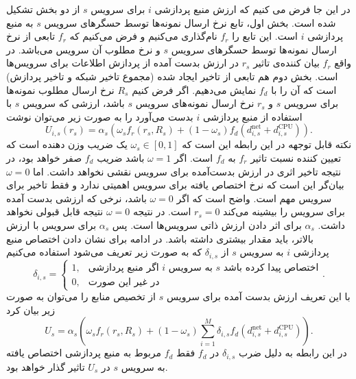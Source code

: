     در این جا فرض می کنیم که ارزش منبع پردازشی $i$ برای سرویس $s$ از دو بخش تشکیل شده است.
    بخش اول، تابع نرخ ارسال نمونه‌ها توسط حسگر‌های سرویس $s$ به منبع پردازشی $i$ است.
    این تابع را $f_r$ نام‌گذاری می‌کنیم و فرض می‌کنیم که $f_r$ تابعی از نرخ ارسال نمونه‌ها توسط حسگر‌های سرویس $s$ و نرخ مطلوب آن سرویس می‌باشد.
    در واقع $f_r$ بیان کننده‌ی تاثیر $r_s$ در ارزش بدست آمده از پردازش اطلاعات برای سرویس‌ها است.
    بخش دوم هم تابعی از تاخیر ایجاد شده (مجموع تاخیر شبکه و تاخیر پردازش) است که آن را با $f_d$ نمایش می‌دهیم.
    اگر فرض کنیم $R_s$ نرخ ارسال مطلوب نمونه‌ها برای سرویس $s$ و $r_s$ نرخ ارسال نمونه‌های سرویس $s$ باشد، ارزشی که سرویس $s$ با استفاده از منبع پردازشی $i$ بدست می‌آورد را به صورت زیر می‌توان نوشت
    \begin{equation}
      U_{i,s}(r_s) = \alpha_s \left (\omega_s f_r(r_s, R_s) + (1-\omega_s) f_d(d_{i,s}^{\text{net}} + d_{i,s}^{\text{CPU}}) \right ) .
    \end{equation}
    نکته قابل توجهه در این رابطه این است که $\omega_s \in [0,1]$ یک ضریب وزن دهنده است که تعیین کننده نسبت تاثیر $f_r$ به $f_d$ است.
    اگر $\omega = 1$ باشد ضریب $f_d$ صفر خواهد بود، در نتیجه تاخیر اثری در ارزش بدست‌آمده برای سرویس نقشی نخواهد داشت.
    اما $\omega = 0$ بیان‌گر این است که نرخ اختصاص یافته برای سرویس اهمیتی ندارد و فقط تاخیر برای سرویس مهم است.
    واضح است که اگر $\omega = 0$ باشد، نرخی که ارزشی بدست آمده برای سرویس را بیشینه می‌کند $r_s = 0$ است.
    در نتیجه $\omega = 0$ نتیجه قابل قبولی نخواهد داشت.
    $\alpha_s$ برای اثر دادن ارزش ذاتی سرویس‌ها است.
    پس $\alpha_s$ برای سرویس با ارزش بالاتر، باید مقدار بیشتری داشته باشد.
    در ادامه برای نشان دادن اختصاص منبع پردازشی $i$ به سرویس $s$ از $\delta_{i,s}$ که به صورت زیر تعریف می‌شود استفاده می‌کنیم
    \begin{equation*}
      \delta_{i,s} = 
      \begin{cases}
        1, & \text{اگر منبع پردازشی $i$ به سرویس $s$ اختصاص پیدا کرده باشد} \\
        0, & \text{در غیر این صورت}
      \end{cases}.
    \end{equation*}
    با این تعریف ارزش بدست آمده برای سرویس $s$ از تخصیص منابع را می‌توان به صورت زیر بیان کرد
    \begin{equation}
      U_{s} =  \alpha_s \left (\omega_s  f_r(r_s, R_s) + (1-\omega_s) \sum_{i=1}^M \delta_{i,s} f_d(d_{i,s}^{\text{net}} + d_{i,s}^{\text{CPU}}) \right).
    \end{equation}
    در این رابطه به دلیل ضرب $\delta_{i,s}$ در $f_d$ فقط $f_d$ مربوط به منبع پردازشی اختصاص یافته به سرویس $s$ در $U_s$ تاثیر گذار خواهد بود.

